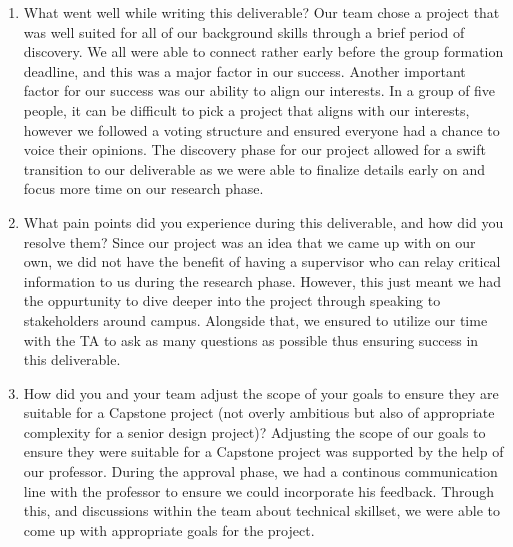 \documentclass{article}
\begin{document}
\begin{enumerate}
    \item What went well while writing this deliverable? 
    Our team chose a project that was well suited for all of our background skills 
    through a brief period of discovery. We all were able to connect rather early before
    the group formation deadline, and this was a major factor in our success. Another important
    factor for our success was our ability to align our interests. In a group of five people, it
    can be difficult to pick a project that aligns with our interests, however we followed a voting 
    structure and ensured everyone had a chance to voice their opinions. The discovery phase for our 
    project allowed for a swift transition to our deliverable as we were able to finalize details early 
    on and focus more time on our research phase.
    \item What pain points did you experience during this deliverable, and how
    did you resolve them?
    Since our project was an idea that we came up with on our own, we did not have the benefit of having a supervisor 
    who can relay critical information to us during the research phase. However, this just meant we had the oppurtunity
    to dive deeper into the project through speaking to stakeholders around campus. Alongside that, we ensured to utilize our time 
    with the TA to ask as many questions as possible thus ensuring success in this deliverable.
    \item How did you and your team adjust the scope of your goals to ensure
    they are suitable for a Capstone project (not overly ambitious but also of
    appropriate complexity for a senior design project)?
    Adjusting the scope of our goals to ensure they were suitable for a Capstone project was supported by the help of our professor. During 
    the approval phase, we had a continous communication line with the professor to ensure we could incorporate his feedback. Through this, 
    and discussions within the team about technical skillset, we were able to come up with appropriate goals for the project.
    
\end{enumerate}  
\end{document}
